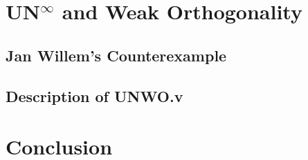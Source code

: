 \documentclass[11pt,oneside,a4paper,final]{report}
\theoremstyle{definition}
\begin{document}
\chapter{UN\texorpdfstring{$^\infty$}{} and Weak Orthogonality}\label{chap:unwo}


\section{Jan Willem's Counterexample}


\section{Description of UNWO.v}


\chapter{Conclusion}\label{chap:conclusion}


\pagebreak


\nocite{*}


\end{document}

